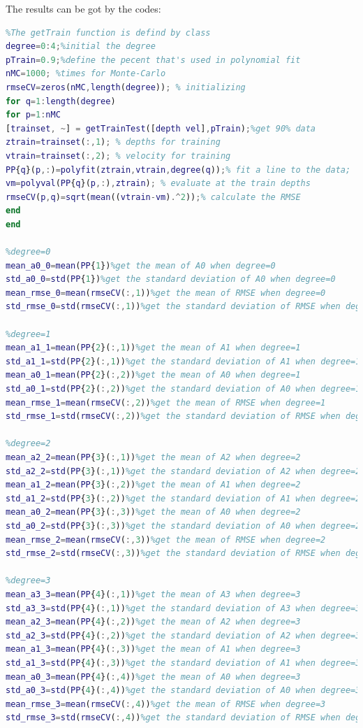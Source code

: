 \documentclass[
	12pt, %
]{fphw}
\begin{document}
The results can be got by the codes:
\begin{lstlisting}[language=Matlab,escapeinside=``]
%I use the getTrain function in this question for convenience 
%The getTrain function is defind by class
degree=0:4;%initial the degree
pTrain=0.9;%define the pecent that's used in polynomial fit
nMC=1000; %times for Monte-Carlo
rmseCV=zeros(nMC,length(degree)); % initializing
for q=1:length(degree)
for p=1:nMC
[trainset, ~] = getTrainTest([depth vel],pTrain);%get 90% data
ztrain=trainset(:,1); % depths for training
vtrain=trainset(:,2); % velocity for training
PP{q}(p,:)=polyfit(ztrain,vtrain,degree(q));% fit a line to the data;
vm=polyval(PP{q}(p,:),ztrain); % evaluate at the train depths
rmseCV(p,q)=sqrt(mean((vtrain-vm).^2));% calculate the RMSE
end
end

%degree=0
mean_a0_0=mean(PP{1})%get the mean of A0 when degree=0
std_a0_0=std(PP{1})%get the standard deviation of A0 when degree=0
mean_rmse_0=mean(rmseCV(:,1))%get the mean of RMSE when degree=0
std_rmse_0=std(rmseCV(:,1))%get the standard deviation of RMSE when degree=0

%degree=1
mean_a1_1=mean(PP{2}(:,1))%get the mean of A1 when degree=1
std_a1_1=std(PP{2}(:,1))%get the standard deviation of A1 when degree=1
mean_a0_1=mean(PP{2}(:,2))%get the mean of A0 when degree=1
std_a0_1=std(PP{2}(:,2))%get the standard deviation of A0 when degree=1
mean_rmse_1=mean(rmseCV(:,2))%get the mean of RMSE when degree=1
std_rmse_1=std(rmseCV(:,2))%get the standard deviation of RMSE when degree=1

%degree=2
mean_a2_2=mean(PP{3}(:,1))%get the mean of A2 when degree=2
std_a2_2=std(PP{3}(:,1))%get the standard deviation of A2 when degree=2
mean_a1_2=mean(PP{3}(:,2))%get the mean of A1 when degree=2
std_a1_2=std(PP{3}(:,2))%get the standard deviation of A1 when degree=2
mean_a0_2=mean(PP{3}(:,3))%get the mean of A0 when degree=2
std_a0_2=std(PP{3}(:,3))%get the standard deviation of A0 when degree=2
mean_rmse_2=mean(rmseCV(:,3))%get the mean of RMSE when degree=2
std_rmse_2=std(rmseCV(:,3))%get the standard deviation of RMSE when degree=2

%degree=3
mean_a3_3=mean(PP{4}(:,1))%get the mean of A3 when degree=3
std_a3_3=std(PP{4}(:,1))%get the standard deviation of A3 when degree=3
mean_a2_3=mean(PP{4}(:,2))%get the mean of A2 when degree=3
std_a2_3=std(PP{4}(:,2))%get the standard deviation of A2 when degree=3
mean_a1_3=mean(PP{4}(:,3))%get the mean of A1 when degree=3
std_a1_3=std(PP{4}(:,3))%get the standard deviation of A1 when degree=3
mean_a0_3=mean(PP{4}(:,4))%get the mean of A0 when degree=3
std_a0_3=std(PP{4}(:,4))%get the standard deviation of A0 when degree=3
mean_rmse_3=mean(rmseCV(:,4))%get the mean of RMSE when degree=3
std_rmse_3=std(rmseCV(:,4))%get the standard deviation of RMSE when degree=3


\end{lstlisting}
\end{document}
